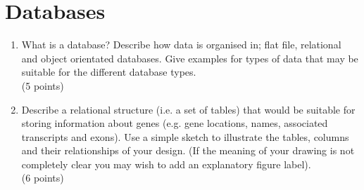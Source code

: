 \documentclass[11pt]{article}
\begin{document}
\section{Databases}
\begin{enumerate}
\item What is a database? Describe how data is organised in; flat file,
  relational and object orientated databases. Give examples for types
  of data that may be suitable for the different database types.\\
  (5 points)
\item Describe a relational structure (i.e. a set of tables) that would be
  suitable for storing information about genes (e.g. gene locations, names,
  associated transcripts and exons). Use a simple sketch to illustrate the
  tables, columns and their relationships of your design. (If the meaning of
  your drawing is not completely clear you may wish to add an explanatory
  figure label).\\
  (6 points)
\end{enumerate}
\end{document}
